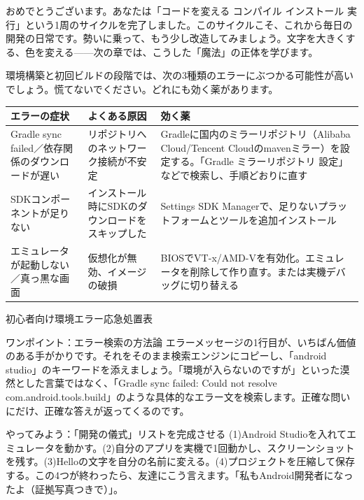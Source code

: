 おめでとうございます。あなたは「コードを変える コンパイル インストール 実行」という1周のサイクルを完了しました。このサイクルこそ、これから毎日の開発の日常です。勢いに乗って、もう少し改造してみましょう。文字を大きくする、色を変える——次の章では、こうした「魔法」の正体を学びます。


環境構築と初回ビルドの段階では、次の3種類のエラーにぶつかる可能性が高いでしょう。慌てないでください。どれにも効く薬があります。

\begin{center}
\begin{tabularx}{\linewidth}{|X|X|X|}
\hline
\textbf{エラーの症状} & \textbf{よくある原因} & \textbf{効く薬} \tabularnewline
\hline
Gradle sync failed／依存関係のダウンロードが遅い & リポジトリへのネットワーク接続が不安定 & Gradleに国内のミラーリポジトリ（Alibaba Cloud/Tencent Cloudのmavenミラー）を設定する。「Gradle ミラーリポジトリ 設定」などで検索し、手順どおりに直す \tabularnewline
SDKコンポーネントが足りない & インストール時にSDKのダウンロードをスキップした & Settings SDK Managerで、足りないプラットフォームとツールを追加インストール \tabularnewline
エミュレータが起動しない／真っ黒な画面 & 仮想化が無効、イメージの破損 & BIOSでVT-x/AMD-Vを有効化。エミュレータを削除して作り直す。または実機デバッグに切り替える \tabularnewline
\hline
\end{tabularx}
\end{center}

\begin{center}\small\color{gray}初心者向け環境エラー応急処置表\end{center}

\begin{tcbinfo}{ワンポイント：エラー検索の方法論}
エラーメッセージの1行目が、いちばん価値のある手がかりです。それをそのまま検索エンジンにコピーし、「android studio」のキーワードを添えましょう。「環境が入らないのですが」といった漠然とした言葉ではなく、「Gradle sync failed: Could not resolve com.android.tools.build」のような具体的なエラー文を検索します。正確な問いにだけ、正確な答えが返ってくるのです。

\end{tcbinfo}

\begin{tcbpractice}{やってみよう：「開発の儀式」リストを完成させる}
(1)Android Studioを入れてエミュレータを動かす。(2)自分のアプリを実機で1回動かし、スクリーンショットを残す。(3)Helloの文字を自分の名前に変える。(4)プロジェクトを圧縮して保存する。この4つが終わったら、友達にこう言えます。「私もAndroid開発者になったよ（証拠写真つきで）」。

\end{tcbpractice}


